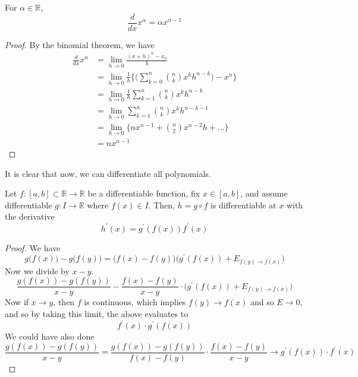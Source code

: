   \begin{theorem}
    \label{thm:power-rule-of-differentiation-for-naturals}
    For $\alpha \in \mathbb{R}$, 
    \begin{equation}
      \frac{d}{dx} x^\alpha = \alpha x^{\alpha - 1} 
    \end{equation}
  \end{theorem}
  \begin{proof}
    By the binomial theorem, we have
    \begin{align}
      \frac{d}{dx} x^n & = \lim_{h \to 0} \frac{(x + h)^n - x_n}{h} \\ 
                       & = \lim_{h \to 0} \frac{1}{h} \bigg\{ \bigg( \sum_{k=0}^n \binom{n}{k} x^k h^{n-k} \bigg) - x^n \bigg\} \\ 
                       & = \lim_{h \to 0} \frac{1}{h} \sum_{k=1}^n \binom{n}{k} x^k h^{n-k} \\
                       & = \lim_{h \to 0} \sum_{k=1}^n \binom{n}{k} x^k h^{n-k - 1} \\
                       & = \lim_{h \to 0} \bigg\{ n x^{n-1} + \binom{n}{2} x^{n-2} h + \ldots \bigg\} \\ 
                       & = n x^{n-1}
    \end{align}
  \end{proof}

  It is clear that now, we can differentiate all polynomials. 

  \begin{theorem}
    \label{thm:chain}
    Let $f: [a, b] \subset \mathbb{R} \to \mathbb{R}$ be a differentiable function, fix $x \in [a, b]$, and assume differentiable $g: I \to \mathbb{R}$ where $f(x) \in I$. Then, $h = g \circ f$ is differentiable at $x$ with the derivative 
    \begin{equation}
      h^\prime (x) = g^\prime (f(x)) f^\prime (x)
    \end{equation}
  \end{theorem}
  \begin{proof}
    We have 
    \begin{equation}
      g \big( f(x)\big) - g \big( f(y)\big) = \big( f(x) - f(y) \big) \big( g^\prime (f(x)) + E_{f(y) \to f(x)}\big)
    \end{equation}
    Now we divide by $x - y$. 
    \begin{equation}
      \frac{g(f(x)) - g(f(y))}{x - y} - \frac{f(x) - f(y)}{x - y} \cdot \big( g^\prime (f(x)) + E_{f(y) \to f(x)} \big)
    \end{equation}
    Now if $x \to y$, then $f$ is continuous, which implies $f(y) \to f(x)$ and so $E \to 0$, and so by taking this limit, the above evaluates to 
    \begin{equation}
      f^\prime (x) \cdot g^\prime (f(x))
    \end{equation} 
    We could have also done 
    \begin{equation}
      \frac{g(f(x)) - g(f(y))}{x - y} = \frac{g(f(x)) - g(f(y))}{f(x) - f(y)} \cdot \frac{f(x) - f(y)}{x  - y} \to g^\prime (f(x)) \cdot f^\prime (x) 
    \end{equation}
  \end{proof}

